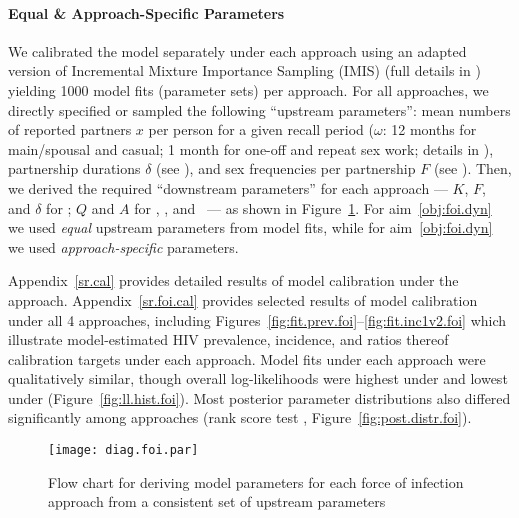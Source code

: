 \paragraph{Equal \& Approach-Specific Parameters}
We calibrated the model separately under each approach
using an adapted version of Incremental Mixture Importance Sampling (IMIS) \cite{Raftery2010}
(full details in )
yielding 1000 model fits (parameter sets) per approach.
For all approaches, we directly specified or sampled the following ``upstream parameters'':
mean numbers of reported partners $x$ per person for a given recall period ($\omega$:
12 months for main/spousal and casual; 1 month for one-off and repeat sex work;
details in ),
partnership durations $\delta$ (see ), and
sex frequencies per partnership $F$ (see ).
Then, we derived the required ``downstream parameters'' for each approach
--- \ie $K$, $F$, and $\delta$ for \epa; $Q$ and $A$ for \ird, \iry, and \ipy\ ---
as shown in Figure~\ref{fig:diag.foi.par}.
For aim~\ref{obj:foi.dyn} we used \emph{equal} upstream parameters from \epa model fits,
while for aim~\ref{obj:foi.dyn} we used \emph{approach-specific} parameters.
\par
Appendix~\ref{sr.cal} provides detailed results of model calibration under the \epa approach.
Appendix~\ref{sr.foi.cal} provides selected results of model calibration under all 4 approaches,
including Figures~\ref{fig:fit.prev.foi}--\ref{fig:fit.inc1v2.foi} which illustrate
model-estimated HIV prevalence, incidence, and ratios thereof
\vs calibration targets under each approach.
Model fits under each approach were qualitatively similar,
though overall log-likelihoods were highest under \ipy and lowest under \iry %
(Figure~\ref{fig:ll.hist.foi}).
Most posterior parameter distributions also differed significantly among approaches
(rank score test \cite{Kruskal1952}, Figure~\ref{fig:post.distr.foi}).
\begin{figure}
  \centering\texttt{[image: diag.foi.par]}
  \caption{Flow chart for deriving model parameters for each force of infection approach
    from a consistent set of upstream parameters}
  \label{fig:diag.foi.par}
\end{figure}
